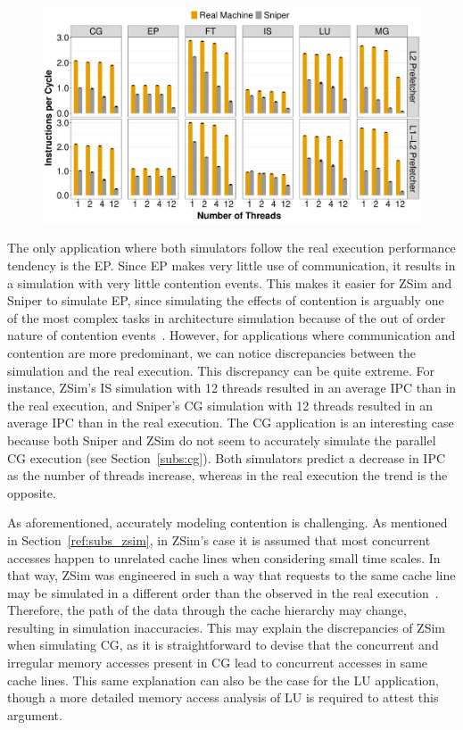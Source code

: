 \documentclass[AMA,final,STIX1COL]{WileyNJD-v2}
\newcommand\new[1]{{\color{red}{#1}}}
\begin{document}
\begin{figure}[!htb]
    \centering
    \includegraphics[width=\linewidth]{figures/ipc-l1-l1-l2-all.pdf}
    \caption{\new{Comparison of Sniper's L2 and L1+L2 prefetchers performance to the real executions results.}}
    \label{fig:sniper_l2}
\end{figure}

The only application where both simulators follow the real execution performance tendency is the EP. Since EP makes very little use of communication, it results in a simulation with very little contention events. 
This makes it easier for ZSim and Sniper to simulate EP, since simulating the effects of contention is arguably one of the most complex tasks in architecture simulation because of the out of order nature of contention events~\cite{sanchez2013zsim}.
However, for applications where communication and contention are more predominant, we can notice discrepancies between the simulation and the real execution. 
This discrepancy can be quite extreme. 
For instance, ZSim's IS simulation with 12 threads resulted in an average IPC \new{30\% lower} than in the real execution, and Sniper's CG simulation with 12 threads resulted in an average IPC \new{426\% lower} than in the real execution. 
The CG application is an interesting case because both Sniper and ZSim do not seem to accurately simulate the parallel CG execution (see Section~\ref{subs:cg}).
Both simulators predict a decrease in IPC as the number of threads increase, whereas in the real execution the trend is the opposite.

As aforementioned, accurately modeling contention is challenging. 
As mentioned in Section~\ref{ref:subs_zsim}, in ZSim's case it is assumed that most concurrent accesses happen to unrelated cache lines when considering small time scales. 
In that way, ZSim was engineered in such a way that requests to the same cache line may be simulated in a different order than the observed in the real execution~\cite{sanchez2013zsim}.
Therefore, the path of the data through the cache hierarchy may change, resulting in simulation inaccuracies.
This may explain the discrepancies of ZSim when simulating CG, as it is straightforward to devise that the concurrent and irregular memory accesses present in CG lead to concurrent accesses in same cache lines.
This same explanation can also be the case for the LU application, though a more detailed memory access analysis of LU is required to attest this argument.
\end{document}
